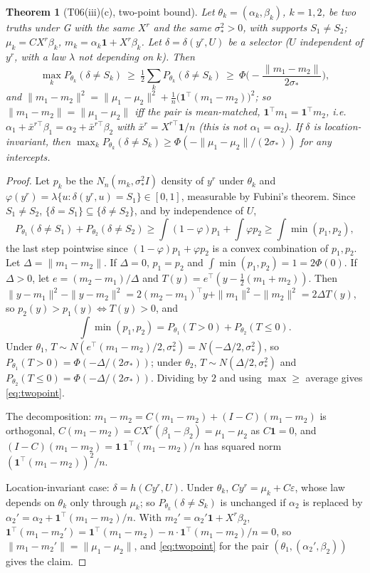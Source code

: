 \documentclass[11pt]{article}
\newtheorem{theorem}{Theorem}[section]
\theoremstyle{remark}
\newcommand{\one}{\mathbf 1}
\begin{document}
\begin{theorem}[T06(iii)(c), two-point bound]\label{thm:twopoint}
Let $\theta_k=(\alpha_k,\beta_k)$, $k=1,2$, be two truths under G with the same $X^r$ and the same $\sigma_*^2>0$, with supports $S_1\ne S_2$; $\mu_k=CX^r\beta_k$, $m_k=\alpha_k\one+X^r\beta_k$. Let $\delta=\delta(y^r,U)$ be a selector ($U$ independent of $y^r$, with a law $\lambda$ not depending on $k$). Then
\begin{equation}\label{eq:twopoint}
\max_kP_{\theta_k}(\delta\ne S_k)\ \ge\ \tfrac12\sum_kP_{\theta_k}(\delta\ne S_k)\ \ge\ \Phi\Big(-\frac{\|m_1-m_2\|}{2\sigma_*}\Big),
\end{equation}
and $\|m_1-m_2\|^2=\|\mu_1-\mu_2\|^2+\frac1n\big(\one^\top(m_1-m_2)\big)^2$; so $\|m_1-m_2\|=\|\mu_1-\mu_2\|$ iff the pair is \emph{mean-matched}, $\one^\top m_1=\one^\top m_2$, i.e.\ $\alpha_1+\bar x^{r\top}\beta_1=\alpha_2+\bar x^{r\top}\beta_2$ with $\bar x^r=X^{r\top}\one/n$ (this is not $\alpha_1=\alpha_2$). If $\delta$ is location-invariant, then $\max_kP_{\theta_k}(\delta\ne S_k)\ge\Phi(-\|\mu_1-\mu_2\|/(2\sigma_*))$ for any intercepts.
\end{theorem}
\begin{proof}
Let $p_k$ be the $N_n(m_k,\sigma_*^2I)$ density of $y^r$ under $\theta_k$ and $\varphi(y^r)=\lambda\{u:\delta(y^r,u)=S_1\}\in[0,1]$, measurable by Fubini's theorem. Since $S_1\ne S_2$, $\{\delta=S_1\}\subseteq\{\delta\ne S_2\}$, and by independence of $U$,
\[
P_{\theta_1}(\delta\ne S_1)+P_{\theta_2}(\delta\ne S_2)\ge\int(1-\varphi)p_1+\int\varphi p_2\ge\int\min(p_1,p_2),
\]
the last step pointwise since $(1-\varphi)p_1+\varphi p_2$ is a convex combination of $p_1,p_2$. Let $\Delta=\|m_1-m_2\|$. If $\Delta=0$, $p_1=p_2$ and $\int\min(p_1,p_2)=1=2\Phi(0)$. If $\Delta>0$, let $e=(m_2-m_1)/\Delta$ and $T(y)=e^\top(y-\tfrac12(m_1+m_2))$. Then $\|y-m_1\|^2-\|y-m_2\|^2=2(m_2-m_1)^\top y+\|m_1\|^2-\|m_2\|^2=2\Delta T(y)$, so $p_2(y)>p_1(y)\iff T(y)>0$, and
\[
\int\min(p_1,p_2)=P_{\theta_1}(T>0)+P_{\theta_2}(T\le0).
\]
Under $\theta_1$, $T\sim N(e^\top(m_1-m_2)/2,\sigma_*^2)=N(-\Delta/2,\sigma_*^2)$, so $P_{\theta_1}(T>0)=\Phi(-\Delta/(2\sigma_*))$; under $\theta_2$, $T\sim N(\Delta/2,\sigma_*^2)$ and $P_{\theta_2}(T\le0)=\Phi(-\Delta/(2\sigma_*))$. Dividing by $2$ and using $\max\ge$ average gives \eqref{eq:twopoint}.

The decomposition: $m_1-m_2=C(m_1-m_2)+(I-C)(m_1-m_2)$ is orthogonal, $C(m_1-m_2)=CX^r(\beta_1-\beta_2)=\mu_1-\mu_2$ as $C\one=0$, and $(I-C)(m_1-m_2)=\one\,\one^\top(m_1-m_2)/n$ has squared norm $(\one^\top(m_1-m_2))^2/n$.

Location-invariant case: $\delta=h(Cy^r,U)$. Under $\theta_k$, $Cy^r=\mu_k+C\varepsilon$, whose law depends on $\theta_k$ only through $\mu_k$; so $P_{\theta_k}(\delta\ne S_k)$ is unchanged if $\alpha_2$ is replaced by $\alpha_2'=\alpha_2+\one^\top(m_1-m_2)/n$. With $m_2'=\alpha_2'\one+X^r\beta_2$, $\one^\top(m_1-m_2')=\one^\top(m_1-m_2)-n\cdot\one^\top(m_1-m_2)/n=0$, so $\|m_1-m_2'\|=\|\mu_1-\mu_2\|$, and \eqref{eq:twopoint} for the pair $(\theta_1,(\alpha_2',\beta_2))$ gives the claim.
\end{proof}
\end{document}
